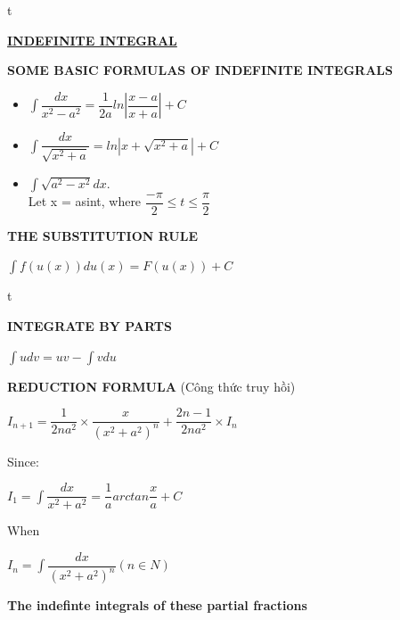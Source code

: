 \documentclass[10pt]{article}
\begin{document}
t
\begin{center}
\textbf{\underline{INDEFINITE INTEGRAL}}
\end{center}
\textbf{SOME BASIC FORMULAS OF INDEFINITE INTEGRALS}
\begin{itemize}
	\item $\displaystyle \int \dfrac{dx}{x^2-a^2} = \dfrac{1}{2a}ln|\dfrac{x-a}{x+a}| + C$
	\item $\displaystyle \int \dfrac{dx}{\sqrt{x^2 +a}} = ln|x+ \sqrt{x^2 +a}| + C$
	\item $\displaystyle \int \sqrt{a^2-x^2}dx$.\\
	Let x = asint, where $\dfrac{- \pi}{2} \le t \le \dfrac{\pi}{2}$
\end{itemize}
\textbf{THE SUBSTITUTION RULE }
\begin{mybox}
\begin{center}
$\displaystyle \int f(u(x))du(x)= F(u(x))+C$
\end{center}t
\end{mybox}
\textbf{INTEGRATE BY PARTS}
\begin{mybox}
\begin{center}
$\displaystyle \int udv = uv- \int vdu$
\end{center}
\end{mybox}
\textbf{REDUCTION FORMULA} (Công thức truy hồi)
\begin{mybox}
\begin{center}
$I_{n+1} = \dfrac{1}{2na^2} \times \dfrac{x}{(x^2+a^2)^n} + \dfrac{2n-1}{2na^2} \times I_n$
\end{center}
\end{mybox}
Since:\\
\begin{center}
$I_1= \displaystyle \int \dfrac{dx}{x^2+a^2} = \dfrac{1}{a}arctan \dfrac{x}{a}+C$
\end{center}
When\\
\begin{mybox}
\begin{center}
$I_n = \displaystyle \int \dfrac{dx}{(x^2+a^2)^n} (n \in N)$
\end{center}
\end{mybox}
\textbf{The indefinte integrals of these partial fractions}
\end{document}
